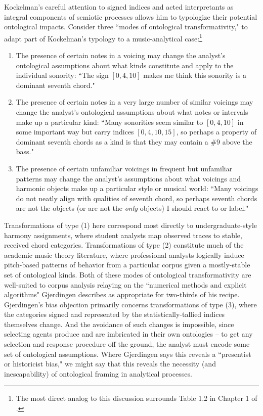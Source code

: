 Kockelman's careful attention to signed indices and acted interpretants as integral components of semiotic processes allows him to typologize their potential ontological impacts.  Consider three ``modes of ontological transformativity," to adapt part of Kockelman's typology to a music-analytical case:\footnote{The most direct analog to this discussion surrounds Table 1.2 in Chapter 1 of \cite{kockelman2013}.}
\begin{enumerate}
	\item The presence of certain notes in a voicing may change the analyst's ontological assumptions about what kinds constitute and apply to the individual sonority: ``The sign $[0,4,10]$ makes me think this sonority is a dominant seventh chord."
	\item The presence of certain notes in a very large number of similar voicings may change the analyst's ontological assumptions about what notes or intervals make up a particular kind: ``Many sonorities seem similar to $[0,4,10]$ in some important way but carry indices $[0,4,10,15]$, so perhaps a property of dominant seventh chords as a kind is that they may contain a $\# 9$ above the bass."
	\item The presence of certain unfamiliar voicings in frequent but unfamiliar patterns may change the analyst's assumptions about what voicings and harmonic objects make up a particular style or musical world: ``Many voicings do not neatly align with qualities of seventh chord, so perhaps seventh chords are not the objects (or are not the \emph{only} objects) I should react to or label."
\end{enumerate}
Transformations of type (1) here correspond most directly to undergraduate-style harmony assignments, where student analysts map observed traces to stable, received chord categories.  Transformations of type (2) constitute much of the academic music theory literature, where professional analysts logically induce pitch-based patterns of behavior from a particular corpus given a mostly-stable set of ontological kinds.  Both of these modes of ontological transformativity are well-suited to corpus analysis relaying on the ``numerical methods and explicit algorithms" Gjerdingen describes as appropriate for two-thirds of his recipe.  Gjerdingen's bias objection primarily concerns transformations of type (3), where the categories signed and represented by the statistically-tallied indices themselves change.  And the avoidance of such changes is impossible, since selecting agents produce and are imbricated in their own ontologies -- to get any selection and response procedure off the ground, the analyst must encode some set of ontological assumptions.  Where Gjerdingen says this reveals a ``presentist or historicist bias," we might say that this reveals the necessity (and inescapability) of ontological framing in analytical processes.

